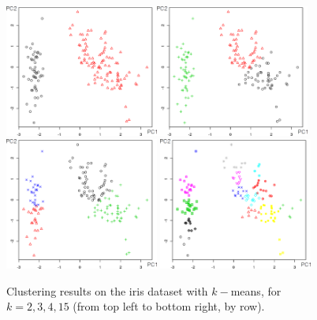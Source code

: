 \afterpage{\FloatBarrier}
\begin{figure}[!t]
\centering
\includegraphics[width=0.45\textwidth]{images/DSML/clustering14.png}\quad \includegraphics[width=0.45\textwidth]{images/DSML/clustering15.png} \\ \includegraphics[width=0.45\textwidth]{images/DSML/clustering16.png} \quad \includegraphics[width=0.45\textwidth]{images/DSML/clustering17.png}
\caption[\small Clustering results on the iris dataset]{\small Clustering results on the iris dataset with $k-$means, for $k=2,3,4,15$ (from top left to bottom right, by row). }\label{fig:clust14151617}
\end{figure}
\afterpage{\FloatBarrier}

